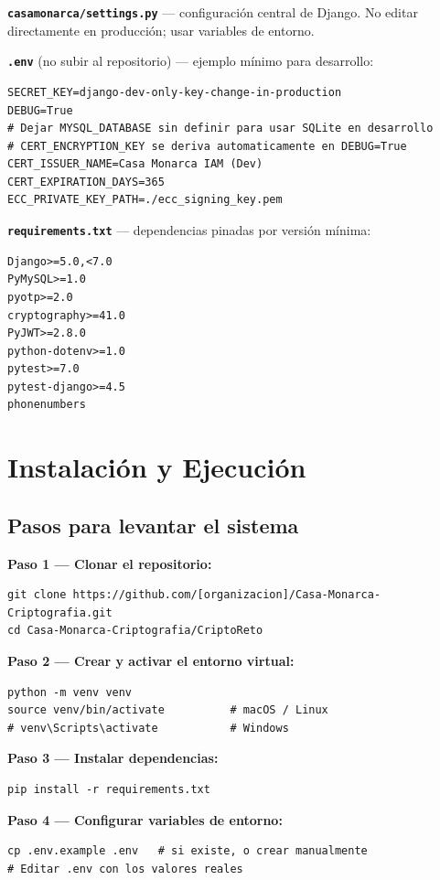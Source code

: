 \documentclass[10pt,letterpaper]{report}
\begin{document}
\textbf{\texttt{casamonarca/settings.py}} --- configuración central de Django. No editar directamente en producción; usar variables de entorno.

\textbf{\texttt{.env}} (no subir al repositorio) --- ejemplo mínimo para desarrollo:
\begin{lstlisting}
SECRET_KEY=django-dev-only-key-change-in-production
DEBUG=True
# Dejar MYSQL_DATABASE sin definir para usar SQLite en desarrollo
# CERT_ENCRYPTION_KEY se deriva automaticamente en DEBUG=True
CERT_ISSUER_NAME=Casa Monarca IAM (Dev)
CERT_EXPIRATION_DAYS=365
ECC_PRIVATE_KEY_PATH=./ecc_signing_key.pem
\end{lstlisting}

\textbf{\texttt{requirements.txt}} --- dependencias pinadas por versión mínima:
\begin{lstlisting}
Django>=5.0,<7.0
PyMySQL>=1.0
pyotp>=2.0
cryptography>=41.0
PyJWT>=2.8.0
python-dotenv>=1.0
pytest>=7.0
pytest-django>=4.5
phonenumbers
\end{lstlisting}

\chapter{Instalación y Ejecución}

\section{Pasos para levantar el sistema}

\textbf{Paso 1 — Clonar el repositorio:}
\begin{lstlisting}
git clone https://github.com/[organizacion]/Casa-Monarca-Criptografia.git
cd Casa-Monarca-Criptografia/CriptoReto
\end{lstlisting}

\textbf{Paso 2 — Crear y activar el entorno virtual:}
\begin{lstlisting}
python -m venv venv
source venv/bin/activate          # macOS / Linux
# venv\Scripts\activate           # Windows
\end{lstlisting}

\textbf{Paso 3 — Instalar dependencias:}
\begin{lstlisting}
pip install -r requirements.txt
\end{lstlisting}

\textbf{Paso 4 — Configurar variables de entorno:}
\begin{lstlisting}
cp .env.example .env   # si existe, o crear manualmente
# Editar .env con los valores reales
\end{lstlisting}
\end{document}
